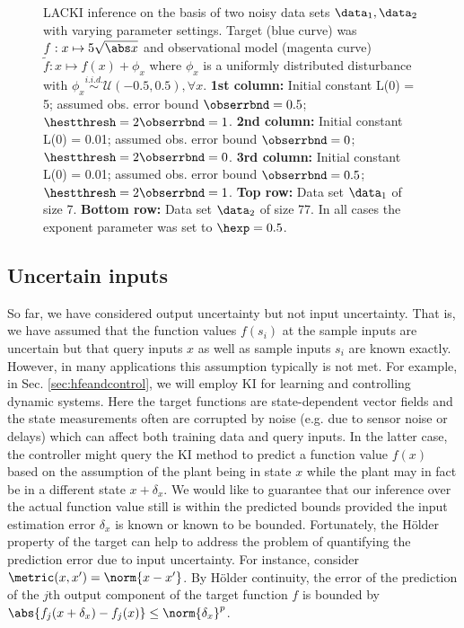 \begin{figure}
{  } 	
   \caption{LACKI inference on the basis of two noisy data sets 
   $\data_1,\data_2$ with varying parameter settings. Target (blue curve) was $f:x \mapsto 5 \sqrt{\abs x}$ and observational model (magenta curve) $\tilde f: x \mapsto f(x) + \phi_x$ where $\phi_x$ is a uniformly distributed disturbance with $\phi_x \stackrel{i.i.d.}{\sim} \mathcal U(-0.5,0.5),\forall x$. 
   \textbf{1st column:} Initial constant L(0) = 5; assumed obs. error bound $\obserrbnd= 0.5$; $\hestthresh = 2 \obserrbnd=1$. 
   \textbf{2nd column:} Initial constant L(0) = 0.01; assumed obs. error bound $\obserrbnd = 0$; $\hestthresh = 2 \obserrbnd =0$.
   \textbf{3rd column:} Initial constant L(0) = 0.01; assumed obs. error bound $\obserrbnd = 0.5$; $\hestthresh = 2 \obserrbnd =1$.
   \textbf{Top row:} Data set $\data_1$ of size 7. 
   \textbf{Bottom row:} Data set $\data_2$ of size 77.
   In all cases the exponent parameter was set to $\hexp = 0.5$.}
			\label{fig:LACKInoise}
\end{figure}	

\subsection{Uncertain inputs}
So far, we have considered output uncertainty but not input uncertainty. That is, we have assumed that the function values $f(s_i)$ at the sample inputs are uncertain but that query inputs $x$ as well as sample 
inputs $s_i$ are known exactly. However, in many applications this assumption typically is not met. For example, in Sec. \ref{sec:hfeandcontrol}, we will employ KI for learning and controlling dynamic systems.
Here the target functions are state-dependent vector fields and the state measurements often are corrupted by noise (e.g. due to sensor noise or delays) which can affect both training data and query inputs. In the latter case, the controller might query the KI method to predict 
a function value $f(x)$ based on the assumption of the plant being in state $x$ while the plant may in fact be in a different state $x+\delta_x$. We would like to guarantee that our inference over the actual function value still is within the predicted bounds provided the input estimation error $\delta_x$ is known or known to be bounded. 
Fortunately, the H\"older property of the target can help to address the problem of quantifying the prediction error due to input uncertainty. For instance, consider $\metric(x,x') = \norm{x-x'}$. By H\"older continuity, the error of the prediction of the $j$th output component of the target function $f$ is bounded by $\abs{f_j(x+\delta_x) - f_j(x)} \leq \norm{\delta_x}^p$. 

